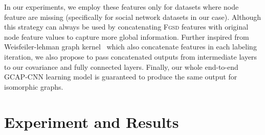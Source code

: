 \documentclass{article}
\begin{document}
In our experiments, we employ   these features only for datasets  where node feature are missing (specifically for social network datasets in our case). Although this strategy can   always be used by concatenating  \textsc{Fgsd} features with original node feature values to capture more global information. Further  inspired from Weisfeiler-lehman graph kernel~\cite{shervashidze2011weisfeiler} which also concatenate features in each labeling iteration, we also propose to pass concatenated   outputs from intermediate layers to our covariance   and  fully connected layers. Finally, our whole end-to-end GCAP-CNN learning model     is guaranteed   to produce the same output  for isomorphic graphs. 
       



 
\section{Experiment and Results}\label{sec:exp_results}
\end{document}

